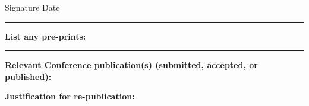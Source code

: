 \documentclass[times,twocolumn,final,authoryear]{elsarticle}
\begin{document}
\begin{table}[!th]
\begin{minipage}{.9\textwidth}
Signature\underline{\hphantom{\hspace*{7cm}}} Date\underline{\hphantom{\hspace*{4cm}}} 
\vskip1pc

\rule{\textwidth}{2pt}
\vskip1pc

{\bf List any pre-prints:}
\vskip5pc


\rule{\textwidth}{2pt}
\vskip1pc

{\bf Relevant Conference publication(s) (submitted, accepted, or
published):}
\vskip5pc



{\bf Justification for re-publication:}

\end{minipage}
\end{table}

\clearpage
\thispagestyle{empty}
\ifpreprint
  \vspace*{-1pc}
\fi
\end{document}
